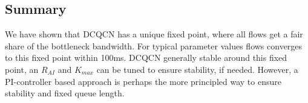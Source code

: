 \subsection{Summary}
We have shown that DCQCN has a unique fixed point, where all flows get a fair
share of the bottleneck bandwidth. For typical parameter values flows converges
to this fixed point within 100ms. DCQCN generally stable around this fixed
point, an $R_{AI}$ and $K_{max}$ can be tuned to ensure stability, if needed.
However, a PI-controller based approach is perhaps the more principled way to
ensure stability and fixed queue length.
